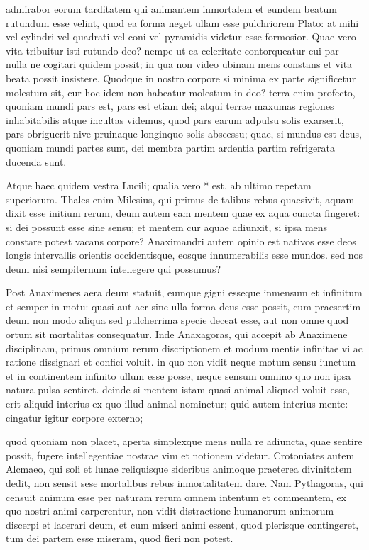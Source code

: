  admirabor eorum tarditatem qui animantem inmortalem et eundem beatum rutundum esse velint, quod ea forma neget ullam esse pulchriorem Plato: at mihi vel cylindri vel quadrati vel coni vel pyramidis videtur esse formosior. Quae vero vita tribuitur isti rutundo deo? nempe ut ea celeritate contorqueatur cui par nulla ne cogitari quidem possit; in qua non video ubinam mens constans et vita beata possit insistere. Quodque in nostro corpore si minima ex parte significetur molestum sit, cur hoc idem non habeatur molestum in deo? terra enim profecto, quoniam mundi pars est, pars est etiam dei; atqui terrae maxumas regiones inhabitabilis atque incultas videmus, quod pars earum adpulsu solis exarserit, pars obriguerit nive pruinaque longinquo solis abscessu; quae, si mundus est deus, quoniam mundi partes sunt, dei membra partim ardentia partim refrigerata ducenda sunt.

 Atque haec quidem vestra Lucili; qualia vero * est, ab ultimo repetam superiorum. Thales enim Milesius, qui primus de talibus rebus quaesivit, aquam dixit esse initium rerum, deum autem eam mentem quae ex aqua cuncta fingeret: si dei possunt esse sine sensu; et mentem cur aquae adiunxit, si ipsa mens constare potest vacans corpore? Anaximandri autem opinio est nativos esse deos longis intervallis orientis occidentisque, eosque innumerabilis esse mundos. sed nos deum nisi sempiternum intellegere qui possumus?

 Post Anaximenes aera deum statuit, eumque gigni esseque inmensum et infinitum et semper in motu: quasi aut aer sine ulla forma deus esse possit, cum praesertim deum non modo aliqua sed pulcherrima specie deceat esse, aut non omne quod ortum sit mortalitas consequatur. Inde Anaxagoras, qui accepit ab Anaximene disciplinam, primus omnium rerum discriptionem et modum mentis infinitae vi ac ratione dissignari et confici voluit. in quo non vidit neque motum sensu iunctum et in continentem infinito ullum esse posse, neque sensum omnino quo non ipsa natura pulsa sentiret. deinde si mentem istam quasi animal aliquod voluit esse, erit aliquid interius ex quo illud animal nominetur; quid autem interius mente: cingatur igitur corpore externo;

 quod quoniam non placet, aperta simplexque mens nulla re adiuncta, quae sentire possit, fugere intellegentiae nostrae vim et notionem videtur. Crotoniates autem Alcmaeo, qui soli et lunae reliquisque sideribus animoque praeterea divinitatem dedit, non sensit sese mortalibus rebus inmortalitatem dare. Nam Pythagoras, qui censuit animum esse per naturam rerum omnem intentum et commeantem, ex quo nostri animi carperentur, non vidit distractione humanorum animorum discerpi et lacerari deum, et cum miseri animi essent, quod plerisque contingeret, tum dei partem esse miseram, quod fieri non potest.

